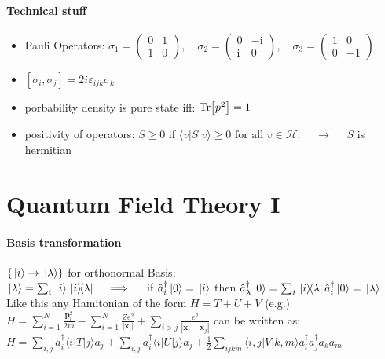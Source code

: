 \paragraph{Technical stuff}
\begin{itemize}
  \item Pauli Operators: $\sigma_1=\left(\begin{array}{cc}
    0 & 1 \\
    1 & 0
    \end{array}\right), \quad \sigma_2=\left(\begin{array}{cc}
    0 & -\mathrm{i} \\
    \mathrm{i} & 0
    \end{array}\right), \quad \sigma_3=\left(\begin{array}{cc}
    1 & 0 \\
    0 & -1
    \end{array}\right)$
  \item $\left[\sigma_i, \sigma_j\right]=2 i \varepsilon_{i j k} \sigma_k$
  \item porbability density is pure state iff: $\Tr[p^2]=1$
  \item positivity of operators: $S \geq 0$ if $\langle v|S| v\rangle \geq 0 \text { for all } v \in \mathcal{H}. \quad $ $\longrightarrow \quad$ $S$ is hermitian


\end{itemize}


\section{Quantum Field Theory I}

\paragraph{Basis transformation} $\{ \ket*{i} \to \ket*{\lambda} \}$  for orthonormal Basis:\\ 
$\ket*{\lambda } = \sum_i \ket*{i} \ketbra*{i}{\lambda} \quad   \implies  \quad $ if $\hat{a}_i^\dagger \ket*{0} = \ket*{i}$ then 
$\hat{a}_\lambda^\dagger \ket*{0} = \sum_i \ketbra*{i}{\lambda} \hat{a}_i^\dagger \ket{0} = \ket*{\lambda} $\\

Like this any Hamitonian of the form $H=T+U+V$ (e.g.) \\ 
$H=\sum_{i=1}^N \frac{\mathbf{p}_i^2}{2 m}-\sum_{i=1}^N \frac{Z e^2}{\left|\mathbf{x}_i\right|}+\sum_{i>j} \frac{e^2}{\left|\mathbf{x}_i-\mathbf{x}_j\right|}$
can be written as:\\
$H=\sum_{i, j} a_i^{\dagger}\langle i|T| j\rangle a_j+\sum_{i, j} a_i^{\dagger}\langle i|U| j\rangle a_j+\frac{1}{2} \sum_{i j k m}\langle i, j|V| k, m\rangle a_i^{\dagger} a_j^{\dagger} a_k a_m$

